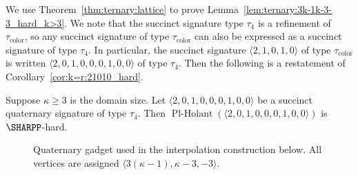 \documentclass[11pt]{article}
\newcommand{\PlHolant}{\operatorname{Pl-Holant}}
\def\borderColor{blue!60}
\def\scale{0.6}
\def\nodeDist{1.4cm}
\begin{document}
We use Theorem~\ref{thm:ternary:lattice} to prove Lemma~\ref{lem:ternary:3k-1k-3-3_hard_k>3}.
We note that the succinct signature type $\tau_4$ is a refinement of $\tau_\text{color}$,
so any succinct signature of type $\tau_\text{color}$ can also be expressed as a succinct signature of type $\tau_4$.
In particular,
the succinct signature $\langle 2,1,0,1,0 \rangle$ of type $\tau_\text{color}$ is written $\langle 2,0,1,0,0,0,1,0,0 \rangle$ of type $\tau_4$.
Then the following is a restatement of Corollary~\ref{cor:k=r:21010_hard}.

\begin{corollary} \label{cor:ternary:201000100_hard}
 Suppose $\kappa \ge 3$ is the domain size.
 Let $\langle 2,0,1,0,0,0,1,0,0 \rangle$ be a succinct quaternary signature of type $\tau_4$.
 Then $\PlHolant(\langle 2,0,1,0,0,0,1,0,0 \rangle)$ is $\SHARPP$-hard.
\end{corollary}

\begin{figure}[t]
 \centering
 \caption{Quaternary gadget used in the interpolation construction below.
 All vertices are assigned $\langle 3 (\kappa - 1), \kappa - 3, -3 \rangle$.}
 \label{fig:gadget:ternary:quaternary:I}
\end{figure}
\end{document}
